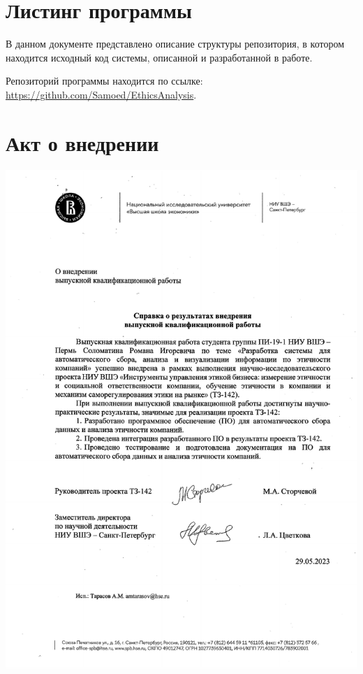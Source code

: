 \documentclass[PI, VKR]{HSEUniversity}
\begin{document}
\chapter{Листинг программы}
\label{sec:orgb7c4196}
В данном документе представлено описание структуры репозитория, в котором находится исходный код системы, описанной и разработанной в работе.

Репозиторий программы находится по ссылке: \url{https://github.com/Samoed/EthicsAnalysis}.
\chapter{Акт о внедрении}
\label{sec:orgc17b0dc}
\hspace*{-2cm}\includegraphics[scale=0.85]{img/deployment_act.pdf}
\end{document}
